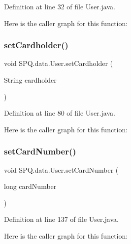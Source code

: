 Definition at line 32 of file User.\+java.

Here is the caller graph for this function\+:
\mbox{\label{class_s_p_q_1_1data_1_1_user_a0fe49415c82bbbbfa0b22822f054157f}} 
\subsubsection{\texorpdfstring{set\+Cardholder()}{setCardholder()}}
{\footnotesize\ttfamily void S\+P\+Q.\+data.\+User.\+set\+Cardholder (\begin{DoxyParamCaption}\item[{String}]{cardholder }\end{DoxyParamCaption})}



Definition at line 80 of file User.\+java.

Here is the caller graph for this function\+:
\mbox{\label{class_s_p_q_1_1data_1_1_user_a6d98a72cb61e95f5417e10e0ba80afab}} 
\subsubsection{\texorpdfstring{set\+Card\+Number()}{setCardNumber()}}
{\footnotesize\ttfamily void S\+P\+Q.\+data.\+User.\+set\+Card\+Number (\begin{DoxyParamCaption}\item[{long}]{card\+Number }\end{DoxyParamCaption})}



Definition at line 137 of file User.\+java.

Here is the caller graph for this function\+:
\mbox{\label{class_s_p_q_1_1data_1_1_user_ab7132f971882fb88afc6999cf5473ef4}} 
